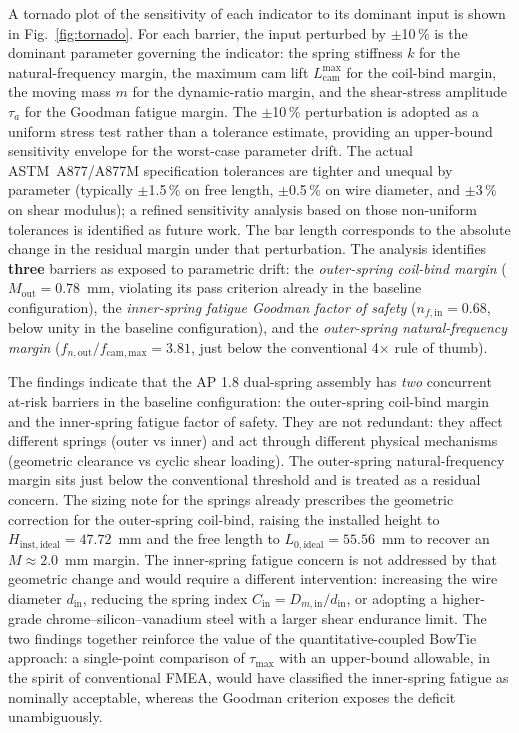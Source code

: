 A tornado plot of the sensitivity of each indicator to its dominant
input is shown in Fig.~\ref{fig:tornado}. For each barrier, the input
perturbed by $\pm$10\,\% is the dominant parameter governing the
indicator: the spring stiffness $k$ for the natural-frequency margin,
the maximum cam lift $L_{\mathrm{cam}}^{\max}$ for the coil-bind
margin, the moving mass $m$ for the dynamic-ratio margin, and the
shear-stress amplitude $\tau_{a}$ for the Goodman fatigue margin. The
$\pm$10\,\% perturbation is adopted as a uniform stress test rather
than a tolerance estimate, providing an upper-bound sensitivity
envelope for the worst-case parameter drift. The actual ASTM~A877/A877M
specification tolerances are tighter and unequal by parameter
(typically $\pm$1.5\,\% on free length, $\pm$0.5\,\% on wire diameter,
and $\pm$3\,\% on shear modulus); a refined sensitivity analysis based
on those non-uniform tolerances is identified as future work. The bar length
corresponds to the absolute change in the residual margin under that
perturbation. The analysis identifies \textbf{three} barriers as
exposed to parametric drift: the \emph{outer-spring coil-bind margin}
($M_{\mathrm{out}}=0.78$~mm, violating its pass criterion already in
the baseline configuration), the \emph{inner-spring fatigue Goodman
factor of safety}
($n_{f,\mathrm{in}}=0.68$, below unity in the baseline configuration),
and the \emph{outer-spring natural-frequency margin}
($f_{n,\mathrm{out}}/f_{\mathrm{cam,max}}=3.81$, just below the
conventional 4$\times$ rule of thumb).

The findings indicate that the AP 1.8 dual-spring assembly has
\emph{two} concurrent at-risk barriers in the baseline configuration:
the outer-spring coil-bind margin and the inner-spring fatigue
factor of safety. They are not redundant: they affect different
springs (outer vs inner) and act through different physical
mechanisms (geometric clearance vs cyclic shear loading). The
outer-spring natural-frequency margin sits just below the
conventional threshold and is treated as a residual concern. The
sizing note for the springs already prescribes the geometric
correction for the outer-spring coil-bind, raising the installed
height to $H_{\mathrm{inst,ideal}}=47.72$~mm and the free length to
$L_{0,\mathrm{ideal}}=55.56$~mm to recover an $M\approx 2.0$~mm
margin. The inner-spring fatigue concern is not addressed by that
geometric change and would require a different intervention:
increasing the wire diameter $d_{\mathrm{in}}$, reducing the spring
index $C_{\mathrm{in}}=D_{m,\mathrm{in}}/d_{\mathrm{in}}$, or
adopting a higher-grade chrome--silicon--vanadium steel with a
larger shear endurance limit. The two findings together reinforce
the value of the quantitative-coupled BowTie approach: a single-point
comparison of $\tau_{\max}$ with an upper-bound allowable, in the
spirit of conventional FMEA, would have classified the inner-spring
fatigue as nominally acceptable, whereas the Goodman criterion
exposes the deficit unambiguously.

